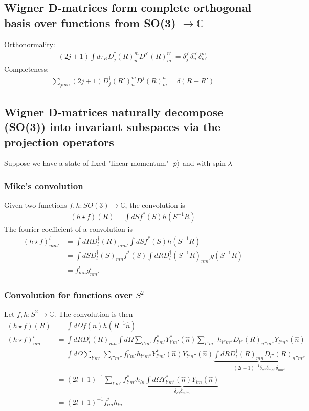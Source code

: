 \documentclass{article}
\begin{document}
\subsection{Wigner D-matrices form complete orthogonal basis over functions from SO(3) $\rightarrow \mathbb{C}$}

Orthonormality:
\begin{align}
    (2j+1)\int d\tau_R D^{\dagger}_j(R)^m_n D^{j'}(R)^{n'}_{m'} = \delta^{j'}_j\delta^{n'}_n\delta^{m}_{m'}
\end{align}
Completeness:
\begin{align}
    \sum_{jmn}(2j+1)D^{\dagger}_j(R')^m_n D^{j}(R)^{n}_{m} = \delta(R - R')
\end{align}

\subsection{Wigner D-matrices naturally decompose (SO(3)) into invariant subspaces via the projection operators}

Suppose we have a state of fixed "linear momentum" $\ket{p}$ and with spin $\lambda$


\subsubsection{Mike's convolution}
Given two functions $f,h:SO(3)\rightarrow \mathbb{C}$, the convolution is 
\begin{align}
    (h\star f)(R) = \int dS f^{*}(S)h(S^{-1}R)
\end{align}
The fourier coefficient of a convolution is
\begin{align}
    (h \star f)^{l}_{mm'} &= \int dR D^{\dagger}_l(R)_{mm'} \int dS f^{*}(S)h(S^{-1}R)\\
    &= \int dS D^{\dagger}_l(S)_{mn} f^{*}(S) \int dR D^{\dagger}_l(S^{-1}R)_{nm'} g(S^{-1}R)\\
    &= f^{l}_{mn}g^l_{nm'}
\end{align}
\subsubsection{Convolution for functions  over $S^2$}
Let $f,h:S^2\rightarrow \mathbb{C}$. The convolution is then
\begin{align}
    (h\star f)(R) &= \int d\Omega f(\hat{n})h(R^{-1}\hat{n})\\
    (h\star f)^{l}_{mn} &= \int dR D^{\dagger}_{l}(R)_{mn}\int d\Omega \sum_{l'm'}f^{*}_{l'm'} Y^{*}_{l'm'}(\hat{n}) \sum_{l''m''}h_{l''m''}D_{l''}(R)_{n''m''}Y_{l''n''}(\hat{n})\\
    &= \int d\Omega \sum_{l'm'}\sum_{l''m''} f^{*}_{l'm'}h_{l''m''}Y^{*}_{l'm'}(\hat{n})Y_{l''n''}(\hat{n})\underbrace{\int dR D^{\dagger}_l(R)_{mn}D_{l''}(R)_{n''m''}}_{(2l+1)^{-1}\delta_{ll''}\delta_{mn''}\delta_{nm''}}\\
    &=  (2l+1)^{-1}\sum_{l'm'} f^{*}_{l'm'}h_{ln} \underbrace{\int d\Omega Y^{*}_{l'm'}(\hat{n})Y_{lm}(\hat{n})}_{\delta_{l'l}\delta_{m'm}}\\
    &= (2l+1)^{-1} f^{*}_{lm}h_{ln}\\ 
\end{align}
\end{document}

